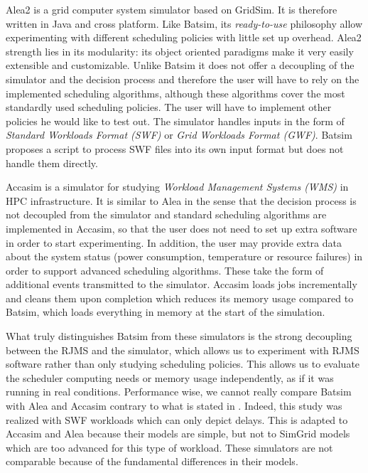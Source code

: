 Alea2\cite{alea2} is a grid computer system simulator based on GridSim. It is
therefore written in Java and cross platform. Like Batsim, its
\textit{ready-to-use} philosophy allow experimenting with different scheduling
policies with little set up overhead.  Alea2 strength lies in its modularity:
its object oriented paradigms make it very easily extensible and customizable.
Unlike Batsim it does not offer a decoupling of the simulator and the decision
process and therefore the user will have to rely on the implemented scheduling
algorithms, although these algorithms cover the most standardly used scheduling
policies.  The user will have to implement other policies he would like to test
out. The simulator handles inputs in the form of \textit{Standard Workloads
Format (SWF)} or \textit{Grid Workloads Format (GWF)}. Batsim proposes a script
to process SWF files into its own input format but does not handle them
directly.

Accasim\cite{10.1007/978-3-319-73353-1_12} is a simulator for studying
\textit{Workload Management Systems (WMS)} in HPC infrastructure. It is similar
to Alea in the sense that the decision process is not decoupled from the
simulator and standard scheduling algorithms are implemented in Accasim, so
that the user does not need to set up extra software in order to start
experimenting. In addition, the user may provide extra data about the system
status (power consumption, temperature or resource failures) in order to
support advanced scheduling algorithms.  These take the form of additional
events transmitted to the simulator. Accasim loads jobs incrementally and
cleans them upon completion which reduces its memory usage compared to Batsim,
which loads everything in memory at the start of the simulation.

What truly distinguishes Batsim from these simulators is the strong decoupling
between the RJMS and the simulator, which allows us to experiment with RJMS
software rather than only studying scheduling policies. This allows us to
evaluate the scheduler computing needs or memory usage independently, as if it
was running in real conditions. Performance wise, we cannot really compare
Batsim with Alea and Accasim contrary to what is stated in
\cite{10.1007/978-3-319-73353-1_12}.  Indeed, this study was realized with SWF
workloads which can only depict delays. This is adapted to Accasim and Alea
because their models are simple, but not to SimGrid models which are too
advanced for this type of workload.  These simulators are not comparable
because of the fundamental differences in their models.

